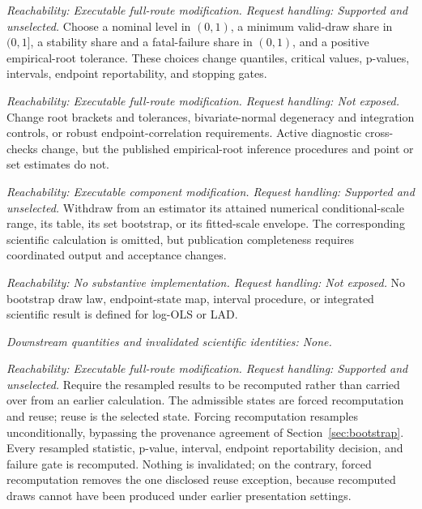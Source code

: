 \documentclass[11pt]{article}
\begin{document}
\begin{description}[style=nextline]
\item[Bootstrap inference contract.]
\emph{Reachability: Executable full-route modification. Request handling: Supported and unselected.}
Choose a nominal level in \((0,1)\), a minimum valid-draw share in \((0,1]\), a stability share and
a fatal-failure share in \((0,1)\), and a positive empirical-root tolerance. These choices change
quantiles, critical values, p-values, intervals, endpoint reportability, and stopping gates.

\item[Normal-approximation calibration controls.]
\emph{Reachability: Executable full-route modification. Request handling: Not exposed.}
Change root brackets and tolerances, bivariate-normal degeneracy and integration controls, or robust
endpoint-correlation requirements. Active diagnostic cross-checks change, but the published
empirical-root inference procedures and point or set estimates do not.

\item[Withdrawal of an estimator capability.]
\emph{Reachability: Executable component modification. Request handling: Supported and unselected.}
Withdraw from an estimator its attained numerical conditional-scale range, its table, its set
bootstrap, or its fitted-scale envelope. The
corresponding scientific calculation is omitted, but publication completeness requires coordinated
output and acceptance changes.

\item[Bootstrap inference for log-OLS or LAD.]
\emph{Reachability: No substantive implementation. Request handling: Not exposed.}
No bootstrap draw law, endpoint-state map, interval procedure, or integrated scientific result is
defined for log-OLS or LAD.

\emph{Downstream quantities and invalidated scientific identities: None.}

\item[Forced resampling.]
\emph{Reachability: Executable full-route modification. Request handling: Supported and unselected.}
Require the resampled results to be recomputed rather than carried over from an earlier
calculation. The admissible states are forced recomputation and reuse; reuse is the selected state.
Forcing recomputation resamples unconditionally, bypassing the provenance agreement of
Section~\ref{sec:bootstrap}. Every resampled statistic, p-value, interval, endpoint reportability
decision, and failure gate is recomputed. Nothing is invalidated; on the contrary, forced recomputation removes the
one disclosed reuse exception, because recomputed draws cannot have been produced under earlier
presentation settings.


\end{description}
\end{document}
